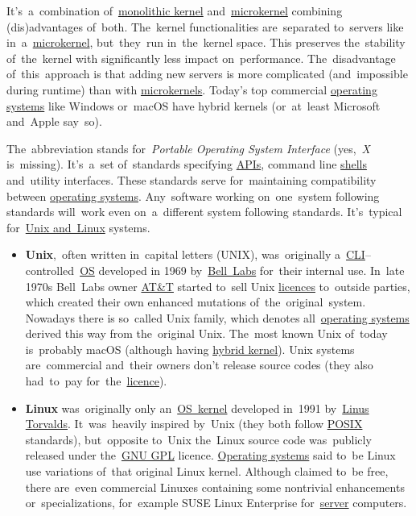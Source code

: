 \label{hybridkernel}
It's~a~combination of~\hyperref[monolithickernel]{monolithic kernel} and~\hyperref[microkernel]{microkernel} combining (dis)advantages of~both. The~kernel functionalities are~separated to~servers like in~a~\hyperref[microkernel]{microkernel}, but~they~run in~the~kernel space. This preserves the~stability of~the~kernel with significantly less impact on~performance. The~disadvantage of~this~approach is that adding new servers is more complicated (and~impossible during runtime) than with \hyperref[microkernel]{microkernels}. Today's top commercial \hyperref[os]{operating systems} like Windows or~macOS have hybrid kernels (or~at~least Microsoft and~Apple say~so).

\label{posix}
The~abbreviation stands for~\textit{Portable Operating System Interface} (yes,~\textit{X} is~missing). It's~a~set of~standards specifying \hyperref[api]{APIs}, command line \hyperref[shellcligui]{shells} and~utility interfaces. These standards serve for~maintaining compatibility between \hyperref[os]{operating systems}. Any~software working on~one~system following standards will~work even on~a~different system following standards. It's~typical for~\hyperref[unixlinux]{Unix and~Linux} systems.

\label{unixlinux}
\begin{itemize}
    \item \textbf{Unix},~often written in~capital letters (UNIX), was~originally a~\hyperref[shellcligui]{CLI}--controlled~\hyperref[os]{OS} developed in 1969 by~\href{https://en.wikipedia.org/wiki/Bell_Labs}{Bell~Labs} for~their internal use. In~late 1970s Bell~Labs owner \href{https://en.wikipedia.org/wiki/AT\%26T}{AT\&T} started to~sell Unix \hyperref[licencing]{licences} to~outside parties, which created their own enhanced mutations of~the~original~system. Nowadays there is so~called Unix family, which denotes all~\hyperref[os]{operating systems} derived this way from the~original Unix. The~most known Unix of~today is~probably macOS (although having \hyperref[hybridkernel]{hybrid kernel}). \warningnonl Unix systems are~commercial and~their owners don't release source codes (they also had~to~pay for~the~\hyperref[licencing]{licence}).
    \item \textbf{Linux} was~originally only an~\hyperref[kernel]{OS~kernel} developed in~1991 by~\href{https://en.wikipedia.org/wiki/Linus_Torvalds}{Linus Torvalds}. It~was~heavily inspired by~Unix (they both follow \hyperref[posix]{POSIX} standards), but~opposite to~Unix the~Linux source code was~publicly released under the~\hyperref[gpl]{GNU GPL} licence. \hyperref[os]{Operating systems} said to~be Linux use variations of~that original Linux kernel. Although claimed to~be free, there are~even commercial Linuxes containing some nontrivial enhancements or~specializations, for~example SUSE Linux Enterprise for~\hyperref[server]{server} computers.
\end{itemize}

